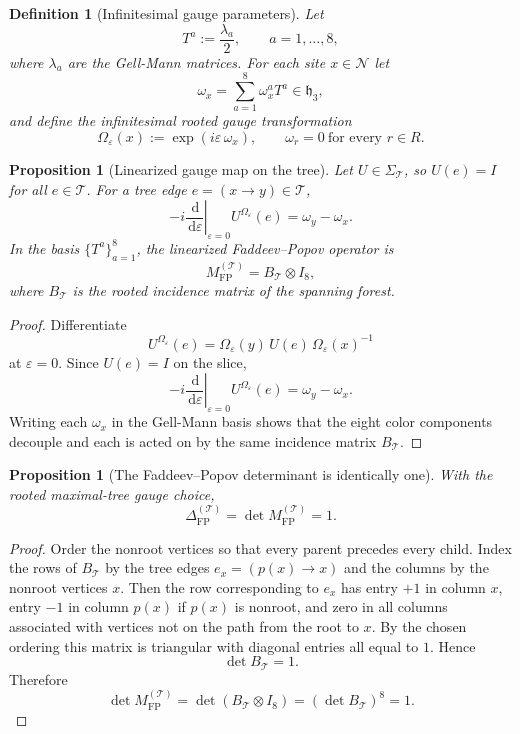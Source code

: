 \documentclass[11pt]{article}
\newtheorem{definition}[theorem]{Definition}
\newtheorem{proposition}[theorem]{Proposition}
\theoremstyle{remark}
\newcommand{\mcN}{\mathcal N}
\newcommand{\mcT}{\mathcal T}
\newcommand{\dd}{\,\mathrm d}
\newcommand{\mcHh}{\mathfrak h_3}
\begin{document}
\begin{definition}[Infinitesimal gauge parameters]
\label{def:inf-gauge}
Let
\[
T^a:=\frac{\lambda_a}{2},\qquad a=1,\dots,8,
\]
where $\lambda_a$ are the Gell-Mann matrices.  For each site $x\in\mcN$ let
\[
\omega_x=\sum_{a=1}^8\omega_x^a T^a\in\mcHh,
\]
and define the infinitesimal rooted gauge transformation
\[
\Omega_\varepsilon(x):=\exp(i\varepsilon\,\omega_x),
\qquad \omega_r=0\ \text{for every }r\in R.
\]
\end{definition}

\begin{proposition}[Linearized gauge map on the tree]
\label{prop:linearized-fp}
Let $U\in\Sigma_{\mcT}$, so $U(e)=I$ for all $e\in\mcT$.  For a tree edge
$e=(x\to y)\in\mcT$,
\[
-i\left.\frac{\dd}{\dd\varepsilon}\right|_{\varepsilon=0}
U^{\Omega_\varepsilon}(e)
=
\omega_y-\omega_x.
\]
In the basis $\{T^a\}_{a=1}^8$, the linearized Faddeev--Popov operator is
\[
M_{\mathrm{FP}}^{(\mcT)} = B_{\mcT}\otimes I_8,
\]
where $B_{\mcT}$ is the rooted incidence matrix of the spanning forest.
\end{proposition}
\begin{proof}
Differentiate
\[
U^{\Omega_\varepsilon}(e)
=
\Omega_\varepsilon(y)\,U(e)\,\Omega_\varepsilon(x)^{-1}
\]
at $\varepsilon=0$.  Since $U(e)=I$ on the slice,
\[
-i\left.\frac{\dd}{\dd\varepsilon}\right|_{\varepsilon=0}
U^{\Omega_\varepsilon}(e)
=
\omega_y-\omega_x.
\]
Writing each $\omega_x$ in the Gell-Mann basis shows that the eight color
components decouple and each is acted on by the same incidence matrix
$B_{\mcT}$.
\end{proof}

\begin{proposition}[The Faddeev--Popov determinant is identically one]
\label{prop:fp-one}
With the rooted maximal-tree gauge choice,
\[
\Delta_{\mathrm{FP}}^{(\mcT)}=\det M_{\mathrm{FP}}^{(\mcT)}=1.
\]
\end{proposition}
\begin{proof}
Order the nonroot vertices so that every parent precedes every child.  Index
the rows of $B_{\mcT}$ by the tree edges $e_x=(p(x)\to x)$ and the columns by
the nonroot vertices $x$.  Then the row corresponding to $e_x$ has entry
$+1$ in column $x$, entry $-1$ in column $p(x)$ if $p(x)$ is nonroot, and zero
in all columns associated with vertices not on the path from the root to $x$.
By the chosen ordering this matrix is triangular with diagonal entries all equal
to $1$.  Hence
\[
\det B_{\mcT}=1.
\]
Therefore
\[
\det M_{\mathrm{FP}}^{(\mcT)}
=
\det(B_{\mcT}\otimes I_8)
=
(\det B_{\mcT})^8
=
1.
\]
\end{proof}
\end{document}
